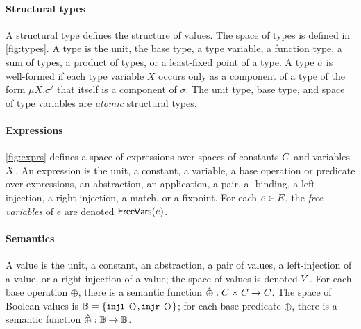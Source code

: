 \paragraph{Structural types}
%
A structural type defines the structure of values.
%
The space of types is defined in \autoref{fig:types}.
%
A type is the unit, the base type, a type variable, a function type, a
sum of types, a product of types, or a least-fixed point of a type.
%
A type $\sigma$ is well-formed if each type variable $X$ occurs only
as a component of a type of the form $\mu X. \sigma'$ that itself is a
component of $\sigma$.
%
The unit type, base type, and space of type variables are
\emph{atomic} structural types.

\paragraph{Expressions}
\autoref{fig:exprs} defines a space of expressions over spaces of
constants $C$ and variables $X$.
An expression is the unit, a constant, a variable, a base operation or
predicate over expressions, an abstraction, an application, a pair, a
-binding, a left injection, a right injection, a match, or a
fixpoint.
%
For each $e \in E$, the \emph{free-variables} of $e$ are denoted
$\mathsf{FreeVars}(e)$.

\paragraph{Semantics}
%
A value is the unit, a constant, an abstraction, a pair of values, a
left-injection of a value, or a right-injection of a value;
%
the space of values is denoted $V$.
%
For each base operation $\oplus$, there is a semantic function
$\hat{\oplus} : C \times C \to C$.
%
The space of Boolean values is
$\bools = \elts{ \injl\ \cc{()}, \injr\ \cc{()}}$;
%
for each base predicate $\oplus$, there is a semantic function
$\hat{\oplus} : \mathbb{B} \to \mathbb{B}$.

